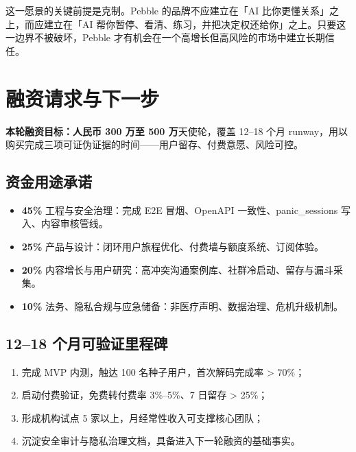 \documentclass[UTF8,11pt,a4paper]{ctexart}
\newcommand{\fact}[1]{\textcolor{PebbleRock}{\textbf{#1}}}
\newcommand{\assumption}[1]{\textcolor{PebbleClay}{\textbf{#1}}}
\begin{document}
这一愿景的关键前提是克制。Pebble 的品牌不应建立在「AI 比你更懂关系」之上，而应建立在「AI 帮你暂停、看清、练习，并把决定权还给你」之上。只要这一边界不被破坏，Pebble 才有机会在一个高增长但高风险的市场中建立长期信任。

\section{融资请求与下一步}

\begin{keyfinding}
\textbf{本轮融资目标：}\assumption{人民币 300 万至 500 万}天使轮，覆盖 12--18 个月 runway，用以购买完成三项可证伪证据的时间——用户留存、付费意愿、风险可控。
\end{keyfinding}

\subsection{资金用途承诺}

\begin{itemize}
  \item \fact{45\%} 工程与安全治理：完成 E2E 冒烟、OpenAPI 一致性、panic\_sessions 写入、内容审核管线。
  \item \fact{25\%} 产品与设计：闭环用户旅程优化、付费墙与额度系统、订阅体验。
  \item \fact{20\%} 内容增长与用户研究：高冲突沟通案例库、社群冷启动、留存与漏斗采集。
  \item \fact{10\%} 法务、隐私合规与应急储备：非医疗声明、数据治理、危机升级机制。
\end{itemize}

\subsection{12--18 个月可验证里程碑}

\begin{enumerate}
  \item 完成 MVP 内测，触达 100 名种子用户，首次解码完成率 \textgreater{} 70\%；
  \item 启动付费验证，免费转付费率 3\%--5\%、7 日留存 \textgreater{} 25\%；
  \item 形成机构试点 5 家以上，月经常性收入可支撑核心团队；
  \item 沉淀安全审计与隐私治理文档，具备进入下一轮融资的基础事实。
\end{enumerate}
\end{document}
